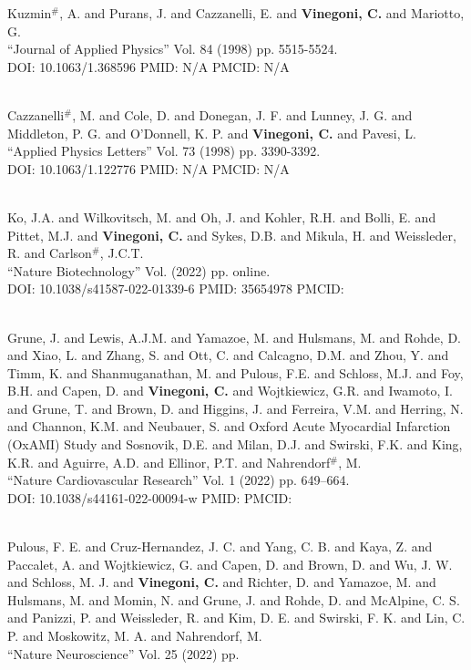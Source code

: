 Kuzmin$^\#$, A. and Purans, J. and Cazzanelli, E. and {\bf Vinegoni, C.} and Mariotto, G. \\ ``Journal of Applied Physics'' Vol. 84 (1998) pp. 5515-5524. \\ DOI: 10.1063/1.368596 PMID: N/A PMCID: N/A\item {} \\ Cazzanelli$^\#$, M. and Cole, D. and Donegan, J. F. and Lunney, J. G. and Middleton, P. G. and O'Donnell, K. P. and {\bf Vinegoni, C.} and Pavesi, L. \\ ``Applied Physics Letters'' Vol. 73 (1998) pp. 3390-3392. \\ DOI: 10.1063/1.122776 PMID: N/A PMCID: N/A\item {} \\ Ko, J.A. and Wilkovitsch, M. and Oh, J. and Kohler, R.H. and Bolli, E. and Pittet, M.J. and {\bf Vinegoni, C.} and Sykes, D.B. and Mikula, H. and Weissleder, R. and Carlson$^\#$, J.C.T. \\ ``Nature Biotechnology'' Vol.  (2022) pp. online. \\ DOI: 10.1038/s41587-022-01339-6 PMID: 35654978 PMCID: \item {} \\ Grune, J. and Lewis, A.J.M. and Yamazoe, M. and Hulsmans, M. and Rohde, D. and Xiao, L. and Zhang, S. and Ott, C. and Calcagno, D.M. and Zhou, Y. and Timm, K. and Shanmuganathan, M. and Pulous, F.E. and Schloss, M.J. and Foy, B.H. and Capen, D. and {\bf Vinegoni, C.} and Wojtkiewicz, G.R. and Iwamoto, I. and Grune, T. and Brown, D. and Higgins, J. and Ferreira, V.M. and Herring, N. and Channon, K.M. and Neubauer, S. and Oxford Acute Myocardial Infarction (OxAMI) Study and Sosnovik, D.E. and Milan, D.J. and Swirski, F.K. and King, K.R. and Aguirre, A.D. and Ellinor, P.T. and Nahrendorf$^\#$, M. \\ ``Nature Cardiovascular Research'' Vol. 1 (2022) pp. 649–664. \\ DOI: 10.1038/s44161-022-00094-w PMID:  PMCID: \item {} \\ Pulous, F. E. and Cruz-Hernandez, J. C. and Yang, C. B. and Kaya, Z. and Paccalet, A. and Wojtkiewicz, G. and Capen, D. and Brown, D. and Wu, J. W. and Schloss, M. J. and {\bf Vinegoni, C.} and Richter, D. and Yamazoe, M. and Hulsmans, M. and Momin, N. and Grune, J. and Rohde, D. and McAlpine, C. S. and Panizzi, P. and Weissleder, R. and Kim, D. E. and Swirski, F. K. and Lin, C. P. and Moskowitz, M. A. and Nahrendorf, M. \\ ``Nature Neuroscience'' Vol. 25 (2022) pp. 